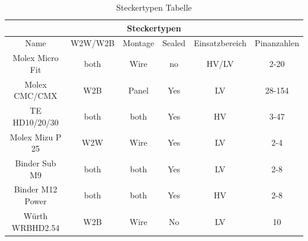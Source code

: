 \begin{table}
	\caption{Steckertypen Tabelle}
	\label{tab:steckertypen}
\begin{tabular}{|c|c|c|c|c|c|}
	
	\hline
	\multicolumn{6}{|c|}{Steckertypen} \\
	\hline
	Name & W2W/W2B & Montage & Sealed & Einsatzbereich & Pinanzahlen \\
	\hline
	Molex Micro Fit & both & Wire & no & HV/LV & 2-20 \\
	\hline
	Molex CMC/CMX & W2B & Panel & Yes & LV  & 28-154 \\
	\hline
	TE HD10/20/30 & both & both & Yes & HV & 3-47 \\
	\hline
	Molex Mizu P 25 & W2W & Wire & Yes & LV & 2-4 \\
	\hline
	Binder Sub M9 & both & both & Yes & LV & 2-8 \\
	\hline
	Binder M12 Power & both & both & Yes & HV & 2-8 \\
	\hline
	Würth WRBHD2.54 & W2B & Wire & No & LV & 10 \\
	\hline
\end{tabular}
\end{table}

